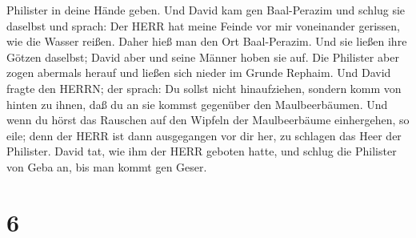 Philister in deine Hände geben.  Und David kam gen
Baal-Perazim und schlug sie daselbst und sprach: Der HERR hat meine
Feinde vor mir voneinander gerissen, wie die Wasser reißen. Daher hieß
man den Ort Baal-Perazim.  Und sie ließen ihre Götzen
daselbst; David aber und seine Männer hoben sie auf.  Die
Philister aber zogen abermals herauf und ließen sich nieder im Grunde
Rephaim.  Und David fragte den HERRN; der sprach: Du sollst
nicht hinaufziehen, sondern komm von hinten zu ihnen, daß du an sie
kommst gegenüber den Maulbeerbäumen.  Und wenn du hörst das
Rauschen auf den Wipfeln der Maulbeerbäume einhergehen, so eile; denn
der HERR ist dann ausgegangen vor dir her, zu schlagen das Heer der
Philister.  David tat, wie ihm der HERR geboten hatte, und
schlug die Philister von Geba an, bis man kommt gen Geser.

\hypertarget{section-5}{%
\section{6}\label{section-5}}

